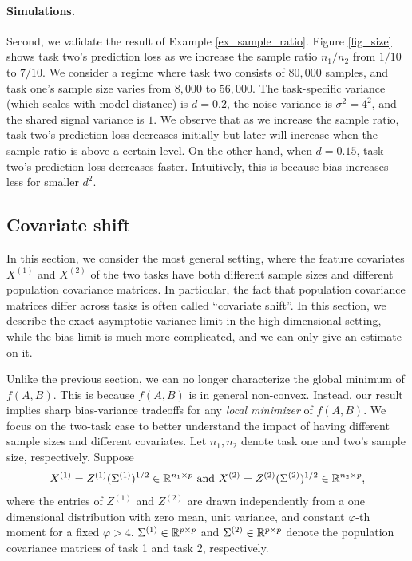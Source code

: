 \paragraph{Simulations.}
Second, we validate the result of Example \ref{ex_sample_ratio}.
Figure \ref{fig_size} shows task two's prediction loss  as we increase the sample ratio $n_1 / n_2$ from $1/10$ to $7/10$.
We consider a regime where task two consists of $80,000$ samples, and task one's sample size varies from $8,000$ to $56,000$.
The task-specific variance (which scales with model distance) is $d = 0.2$, the noise variance is $\sigma^2 = 4^2$, and the shared signal variance is $1$. We observe that as we increase the sample ratio, task two's prediction loss decreases initially but later will increase when the sample ratio is above a certain level.
On the other hand, when $d = 0.15$, task two's prediction loss decreases faster.
Intuitively, this is because bias increases less for smaller $d^2$.


\subsection{Covariate shift}\label{sec_diff}

In this section, we consider the most general setting, where the feature covariates $X^{(1)}$ and $X^{(2)}$ of the two tasks have both different sample sizes and different population covariance matrices.
In particular, the fact that population covariance matrices differ across tasks is often called ``covariate shift''. %
In this section, we describe the exact asymptotic variance limit in the high-dimensional setting, while the bias limit is much more complicated, and we can only give an estimate on it.

\iffalse
Unlike the previous section, we can no longer characterize the global minimum of $f(A, B)$.
This is because $f(A, B)$ is in general non-convex.
Instead, our result implies sharp bias-variance tradeoffs for any \emph{local minimizer} of $f(A, B)$.
We focus on the two-task case to better understand the impact of having different sample sizes and different covariates.
Let $n_1, n_2$ denote task one  and two's sample size, respectively.
Suppose
\begin{align*}
	X^{(1)} = Z^{(1)}(\Sigma^{(1)})^{1/2} \in \real^{n_1 \times p} \text{ and }
	X^{(2)} = Z^{(2)}(\Sigma^{(2)})^{1/2} \in \real^{n_2 \times p},
\end{align*}
where the entries of $Z^{(1)}$ and $ Z^{(2)}$ are drawn independently from a one dimensional distribution with zero mean, unit variance, and constant $\varphi$-th moment for a fixed $\varphi > 4$. $\Sigma^{(1)}\in \mathbb{R}^{p\times p}$ and $\Sigma^{(2)}\in \mathbb{R}^{p\times p}$ denote the population covariance matrices of task 1 and task 2, respectively.


